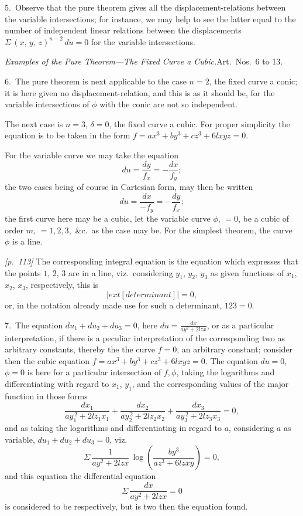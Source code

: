 \documentclass[11pt,a4paper]{article}
\theoremstyle{plain}
\theoremstyle{definition}
\theoremstyle{remark}
\begin{document}
5.\ Observe that the pure theorem gives all the displacement-relations between the variable intersections; for instance, we may help to see the latter equal to the number of independent linear relations between the displacements $\Sigma\,(x,\,y,\,z)^{n-2}\,du = 0$ for the variable intersections.

\textit{Examples of the Pure Theorem---The Fixed Curve a Cubic.}\quad Art.\ Nos.\ 6 to 13.

6.\ The pure theorem is next applicable to the case $n = 2$, the fixed curve a conic; it is here given no displacement-relation, and this is as it should be, for the variable intersections of $\phi$ with the conic are not so independent.

The next case is $n = 3$, $\delta = 0$, the fixed curve a cubic. For proper simplicity the equation is to be taken in the form $f = ax^3 + by^3 + cz^3 + 6lxyz = 0$.

For the variable curve we may take the equation
\[
du = \frac{dy}{f_x} = -\frac{dx}{f_y};
\]
the two cases being of course in Cartesian form, may then be written
\[
du = \frac{dx}{-f_y} = -\frac{dy}{f_x};
\]
the first curve here may be a cubic, let the variable curve $\phi$, $= 0$, be a cubic of order $m$, $= 1, 2, 3,$ \&c.\ as the case may be. For the simplest theorem, the curve $\phi$ is a line.

\noindent\textit{[p.~113]} The corresponding integral equation is the equation which expresses that the points $1$, $2$, $3$ are in a line, viz.\ considering $y_1$, $y_2$, $y_3$ as given functions of $x_1$, $x_2$, $x_3$, respectively, this is
\[
\left|
	ext{[determinant]}
\right| = 0,
\]
or, in the notation already made use for such a determinant, $123 = 0$.

\bigskip

7.\ The equation $du_1 + du_2 + du_3 = 0$, here $du = \frac{dx}{ay^2 + 2lzx}$, or as a particular interpretation, if there is a peculiar interpretation of the corresponding two as arbitrary constants, thereby the the curve $f = 0$, an arbitrary constant; consider then the cubic equation $f = ax^3 + by^3 + cz^3 + 6lxyz = 0$. The equation $du = 0$, $\phi = 0$ is here for a particular intersection of $f, \phi$, taking the logarithms and differentiating with regard to $x_1$, $y_1$, and the corresponding values of the major function in those forms
\[
\frac{dx_1}{ay_1^{\,2} + 2lz_1x_1} + \frac{dx_2}{ay_2^{\,2} + 2lz_2x_2} + \frac{dx_3}{ay_3^{\,2} + 2lz_3x_3} = 0,
\]
and as taking the logarithms and differentiating in regard to $a$, considering $a$ as variable, $du_1 + du_2 + du_3 = 0$, viz.
\[
\Sigma\,\frac{1}{ay^2 + 2lzx}\,\log\!\left(\frac{by^3}{az^3 + 6lzxy}\right) = 0,
\]
and this equation the differential equation
\[
\Sigma\,\frac{dx}{ay^2 + 2lzx} = 0
\]
is considered to be respectively, but is two then the equation found.
\end{document}
